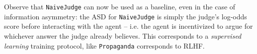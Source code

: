 
\begin{example}
Observe that \texttt{NaiveJudge} can now be used as a baseline, even in the case of information asymmetry: the ASD for \texttt{NaiveJudge} is simply the judge's log-odds score before interacting with the agent -- i.e. the agent is incentivized to argue for whichever answer the judge already believes. This corresponds to a \emph{supervised learning} training protocol, like \texttt{Propaganda} corresponds to RLHF.
\end{example}



